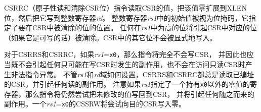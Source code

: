 CSRRC（原子性读和清除CSR位）指令读取CSR的值，把该值零扩展到XLEN位，然后把它写到整数寄存器{\em rd}。
整数寄存器{\em rs1}中的初始值被视为位掩码，它指定了要在CSR中被清除的位的位置。
任何在{\em rs1}中为高的位将引起CSR中对应的位（如果它是可写的话）被清除。CSR中的其它位不会被显式地写入。

对于CSRRS和CSRRC，如果{\em rs1}={\tt x0}，那么指令将完全不会写CSR，
并因此也应当既不会引起任何只可能在写CSR时发生的副作用，也不会在访问只读CSR时产生非法指令异常。
不管{\em rs1}和{\em rd}域如何设置，CSRRS和CSRRC都总是读取已编址的CSR，并引起任何读的副作用。
注意如果{\em rs1}指定了一个持有{\tt x0}以外的零值的寄存器，那么指令将仍然尝试把未修改的值写回到CSR，
并将引起任何随之而来的副作用。一个{\em rs1}={\tt x0}的CSSRW将尝试向目的CSR写入零。

